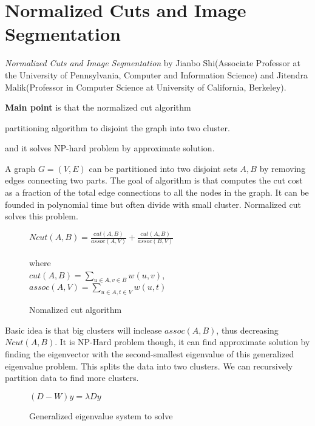 \section{Normalized Cuts and Image Segmentation}
\label{ch:jianbo00}

\textit{Normalized Cuts and Image Segmentation} by Jianbo Shi(Associate Professor at the University of Pennsylvania, Computer and Information Science) and Jitendra Malik(Professor in Computer Science at University of California, Berkeley).
\newline

\textbf{Main point} is that the normalized cut algorithm \begin{inparaenum}
\item partitioning algorithm to disjoint the graph into two cluster.
\item and it solves NP-hard problem by approximate solution.
\end{inparaenum}

A graph $G = (V, E)$ can be partitioned into two disjoint sets $A, B$ by removing edges connecting two parts. The goal of algorithm is that computes the cut cost as a fraction of the total edge connections to all the nodes in the graph. It can be founded in polynomial time but often divide with small cluster. Normalized cut solves this problem.

\begin{figure}[ht]
\begin{mdframed}
$Ncut(A,B) = \frac{cut(A,B)}{assoc(A,V)} + \frac{cut(A,B)}{assoc(B,V)}$ \\
\\
where \\
$cut(A,B) = \sum_{u \in A, v \in B} w(u, v)$,\\
$assoc(A,V) = \sum_{u \in A, t \in V} w(u, t)$
\end{mdframed}
\caption{Nomalized cut algorithm}
\end{figure}

Basic idea is that big clusters will inclease $assoc(A,B)$, thus decreasing $Ncut(A,B)$. It is NP-Hard problem though, it can find approximate solution by finding the eigenvector with the second-smallest eigenvalue of this generalized eigenvalue problem. This splits the data into two clusters. We can recursively partition data to find more clusters.
\begin{figure}[ht]
\begin{mdframed}
$(D - W)y = \lambda D y$
\end{mdframed}
\caption{Generalized eigenvalue system to solve}
\end{figure}


